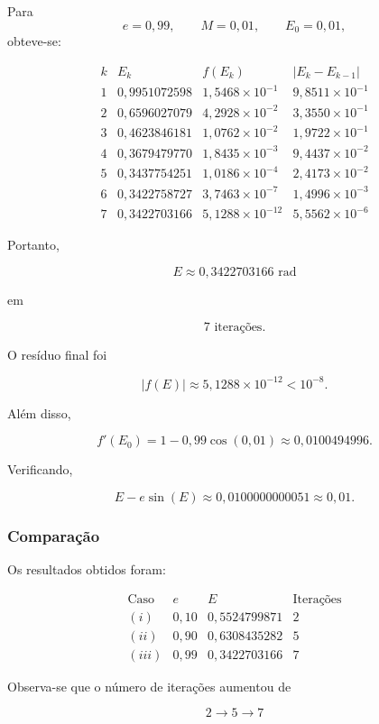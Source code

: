 \documentclass[
	12pt,				%
	openright,			%
	a4paper,			%
	english,			%
	french,				%
	spanish,			%
	brazil,				%
	]{abntex2}
\begin{document}
Para
\[
e=0,99,
\qquad
M=0,01,
\qquad
E_0=0,01,
\]
obteve-se:

\[
\begin{array}{c|c|c|c}
k & E_k & f(E_k) & |E_k-E_{k-1}| \\ \hline
1 & 0,9951072598 & 1,5468\times10^{-1} & 9,8511\times10^{-1} \\
2 & 0,6596027079 & 4,2928\times10^{-2} & 3,3550\times10^{-1} \\
3 & 0,4623846181 & 1,0762\times10^{-2} & 1,9722\times10^{-1} \\
4 & 0,3679479770 & 1,8435\times10^{-3} & 9,4437\times10^{-2} \\
5 & 0,3437754251 & 1,0186\times10^{-4} & 2,4173\times10^{-2} \\
6 & 0,3422758727 & 3,7463\times10^{-7} & 1,4996\times10^{-3} \\
7 & 0,3422703166 & 5,1288\times10^{-12} & 5,5562\times10^{-6}
\end{array}
\]

Portanto,

\[
\boxed{E\approx0,3422703166\text{ rad}}
\]

em

\[
\boxed{7\text{ iterações}}.
\]

O resíduo final foi

\[
|f(E)|
\approx
5,1288\times10^{-12}
<
10^{-8}.
\]

Além disso,

\[
f'(E_0)
=
1-0,99\cos(0,01)
\approx
0,0100494996.
\]

Verificando,

\[
E-e\sin(E)
\approx
0,0100000000051
\approx
0,01.
\]


\subsubsection*{Comparação}

Os resultados obtidos foram:

\[
\begin{array}{c|c|c|c}
\text{Caso} & e & E & \text{Iterações} \\ \hline
(i)   & 0,10 & 0,5524799871 & 2 \\
(ii)  & 0,90 & 0,6308435282 & 5 \\
(iii) & 0,99 & 0,3422703166 & 7
\end{array}
\]

Observa-se que o número de iterações aumentou de

\[
2\longrightarrow5\longrightarrow7
\]
\end{document}
